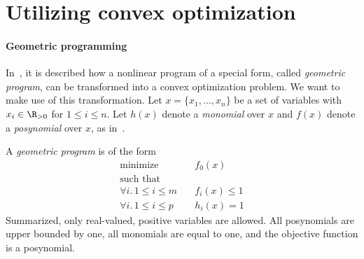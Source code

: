 		

\section{Utilizing convex optimization}

\paragraph{Geometric programming}
In~\cite{boyd_convex_optimization}, it is described how a nonlinear program of a special form, called \emph{geometric program}, can be transformed into a convex optimization problem. We want to make use of this transformation.
Let $x=\{x_1,\ldots,x_n\}$ be a set of variables with $x_i\in\R_{>0}$ for $1\leq i\leq n$. Let $h(x)$ denote a \emph{monomial} over $x$ and $f(x)$ denote a \emph{posynomial} over $x$, as in~\cite{boyd_convex_optimization}. 

A \emph{geometric program} is of the form
\begin{align}
	\text{minimize} 		&\quad f_0(x)\\
	\text{such that} 		&\\
	\forall i.\, 1\leq i\leq m 	&\quad f_i(x)\leq 1\\
	\forall i.\, 1\leq i\leq p 	&\quad h_i(x)= 1
\end{align}
Summarized, only real-valued, positive variables are allowed. All posynomials are upper bounded by one, all monomials are equal to one, and the objective function is a posynomial.



